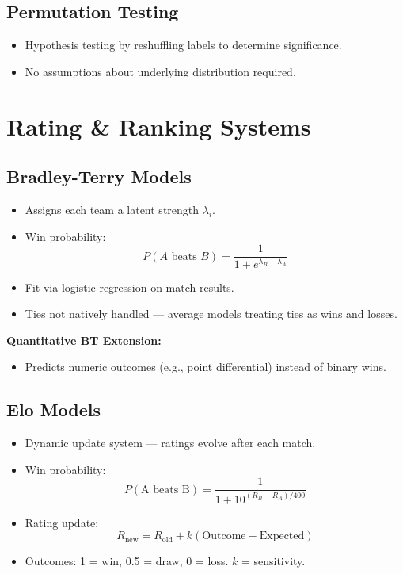 \documentclass[10pt, landscape]{article}
\begin{document}
\begin{multicols}{3}
\subsection{Permutation Testing}
\begin{itemize}[noitemsep]
    \item Hypothesis testing by reshuffling labels to determine significance.
    \item No assumptions about underlying distribution required.
\end{itemize}

\section{Rating \& Ranking Systems}

\subsection{Bradley-Terry Models}
\begin{itemize}[noitemsep]
    \item Assigns each team a latent strength \( \lambda_i \).
    \item Win probability: 
    \[
    P(A \text{ beats } B) = \frac{1}{1 + e^{\lambda_B - \lambda_A}}
    \]
    \item Fit via logistic regression on match results.
    \item Ties not natively handled — average models treating ties as wins and losses.
\end{itemize}

\textbf{Quantitative BT Extension:}
\begin{itemize}[noitemsep]
    \item Predicts numeric outcomes (e.g., point differential) instead of binary wins.
\end{itemize}

\vspace{0.3em}
\subsection{Elo Models}
\begin{itemize}[noitemsep]
    \item Dynamic update system — ratings evolve after each match.
    \item Win probability:
    \[
    P(\text{A beats B}) = \frac{1}{1 + 10^{(R_B - R_A)/400}}
    \]
    \item Rating update:
    \[
    R_{\text{new}} = R_{\text{old}} + k(\text{Outcome} - \text{Expected})
    \]
    \item Outcomes: 1 = win, 0.5 = draw, 0 = loss. \(k\) = sensitivity.
\end{itemize}


\end{multicols}
\end{document}

